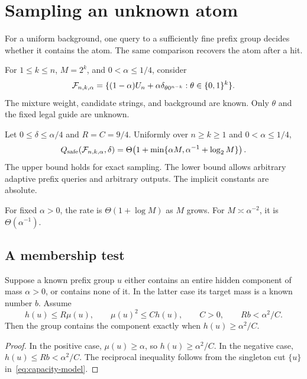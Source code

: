 \section{Sampling an unknown atom}\label{sec:local}
For a uniform background, one query to a sufficiently fine prefix group decides whether it contains the atom. The same comparison recovers the atom after a hit.

For $1\le k\le n$, $M=2^k$, and $0<\alpha\le1/4$, consider
\begin{equation}\label{eq:spike-class}
 \mathcal F_{n,k,\alpha}=\{(1-\alpha)U_n+\alpha\delta_{\theta0^{n-k}}:
                    \theta\in\{0,1\}^k\}.
\end{equation}
The mixture weight, candidate strings, and background are known. Only $\theta$ and the fixed legal guide are unknown.

\begin{theorem}\label{thm:local-rate}
Let $0\le\delta\le\alpha/4$ and $R=C=9/4$. Uniformly over $n\ge k\ge1$ and $0<\alpha\le1/4$,
\begin{equation}\label{eq:local-rate}
 Q_{\mathrm{safe}}(\mathcal F_{n,k,\alpha},\delta)
 =\Theta\!\left(1+\min\{\alpha M,\alpha^{-1}+\log_2 M\}\right).
\end{equation}
The upper bound holds for exact sampling. The lower bound allows arbitrary adaptive prefix queries and arbitrary outputs. The implicit constants are absolute.
\end{theorem}

For fixed $\alpha>0$, the rate is $\Theta(1+\log M)$ as $M$ grows. For $M\asymp\alpha^{-2}$, it is $\Theta(\alpha^{-1})$.

\subsection{A membership test}
\begin{lemma}\label{lem:local-test}
Suppose a known prefix group $u$ either contains an entire hidden component of mass $\alpha>0$, or contains none of it. In the latter case its target mass is a known number $b$. Assume
\[
 h(u)\le R\mu(u),\qquad \mu(u)^2\le C h(u),\qquad C>0,
 \qquad Rb<\alpha^2/C.
\]
Then the group contains the component exactly when $h(u)\ge\alpha^2/C$.
\end{lemma}
\begin{proof}
In the positive case, $\mu(u)\ge\alpha$, so $h(u)\ge\alpha^2/C$. In the negative case, $h(u)\le Rb<\alpha^2/C$. The reciprocal inequality follows from the singleton cut $\{u\}$ in~\eqref{eq:capacity-model}.
\end{proof}

